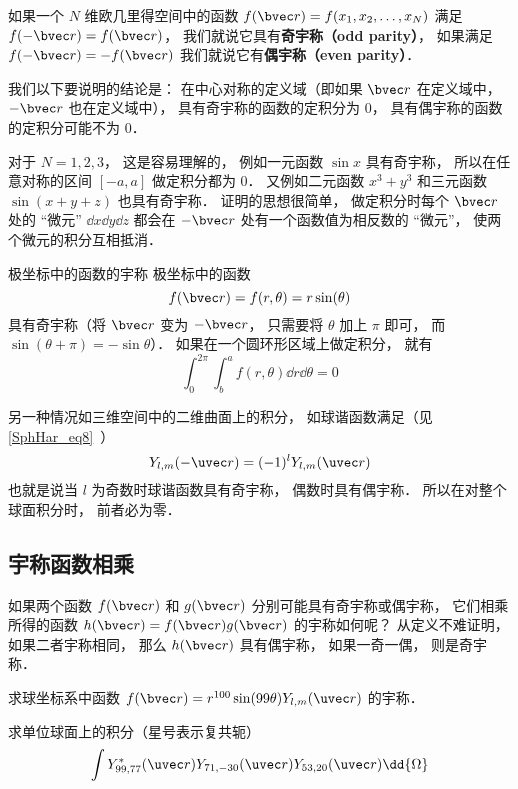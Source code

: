 

如果一个 $N$ 维欧几里得空间中的函数 $f(\bvec r) = f(x_1, x_2, \dots, x_N)$ 满足  $f(-\bvec r) = f(\bvec r)$， 我们就说它具有\textbf{奇宇称（odd parity）}， 如果满足  $f(-\bvec r) = -f(\bvec r)$ 我们就说它有\textbf{偶宇称（even parity）}．

我们以下要说明的结论是： 在中心对称的定义域（即如果 $\bvec r$ 在定义域中， $-\bvec r$ 也在定义域中）， 具有奇宇称的函数的定积分为 0， 具有偶宇称的函数的定积分可能不为 0．

对于 $N = 1, 2, 3$， 这是容易理解的， 例如一元函数 $\sin x$ 具有奇宇称， 所以在任意对称的区间 $[-a, a]$ 做定积分都为 0． 又例如二元函数 $x^3 + y^3$ 和三元函数 $\sin(x + y + z)$ 也具有奇宇称． 证明的思想很简单， 做定积分时每个 $\bvec r$ 处的 “微元” $\dd{x}\dd{y}\dd{z}$ 都会在 $-\bvec r$ 处有一个函数值为相反数的 “微元”， 使两个微元的积分互相抵消．

\begin{example}{极坐标中的函数的宇称}
极坐标中的函数
\begin{equation}\label{IntPry_eq1}
f(\bvec r) = f(r, \theta) = r\sin(\theta)
\end{equation}
具有奇宇称（将 $\bvec r$ 变为 $-\bvec r$， 只需要将 $\theta$ 加上 $\pi$ 即可， 而 $\sin(\theta + \pi) = -\sin\theta$）． 如果在一个圆环形区域上做定积分， 就有
\begin{equation}
\int_0^{2\pi} \int_b^a f(r, \theta) \dd{r} \dd{\theta} = 0
\end{equation}
\end{example}

另一种情况如三维空间中的二维曲面上的积分， 如球谐函数满足（见\autoref{SphHar_eq8}~）
\begin{equation}\label{IntPry_eq3}
Y_{l,m}(-\uvec r) = (-1)^l Y_{l,m}(\uvec r)
\end{equation}
也就是说当 $l$ 为奇数时球谐函数具有奇宇称， 偶数时具有偶宇称． 所以在对整个球面积分时， 前者必为零．

\subsection{宇称函数相乘}
如果两个函数 $f(\bvec r)$ 和 $g(\bvec r)$ 分别可能具有奇宇称或偶宇称， 它们相乘所得的函数 $h(\bvec r) = f(\bvec r) g(\bvec r)$ 的宇称如何呢？ 从定义不难证明， 如果二者宇称相同， 那么 $h(\bvec r)$ 具有偶宇称， 如果一奇一偶， 则是奇宇称．

\begin{exercise}{}
求球坐标系中函数 $f(\bvec r) = r^{100}\sin(99\theta) Y_{l, m}(\uvec r)$ 的宇称．
\end{exercise}

\begin{exercise}{}
求单位球面上的积分（星号表示复共轭）
\begin{equation}
\int Y_{99, 77}^*(\uvec r) Y_{71, -30}(\uvec r) Y_{53, 20}(\uvec r) \dd{\Omega}
\end{equation}
\end{exercise}
